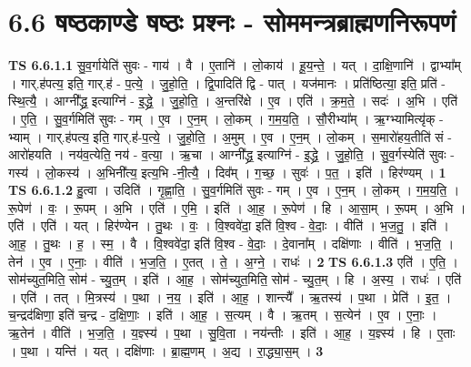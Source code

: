 \documentclass[17pt]{extarticle}
\begin{document}
\section*{ 6.6       षष्ठकाण्डे षष्ठः प्रश्नः - सोममन्त्रब्राह्मणनिरूपणं }
                                \textbf{ TS 6.6.1.1} \newline
                  सु॒व॒र्गायेति॑ सुवः - गाय॑ । वै । ए॒तानि॑ । लो॒काय॑ । हू॒य॒न्ते॒ । यत् । दा॒क्षि॒णानि॑ । द्वाभ्या᳚म् । गार्.ह॑पत्य॒ इति॒ गार्.ह॑ - प॒त्ये॒ । जु॒हो॒ति॒ । द्वि॒पादिति॑ द्वि - पात् । यज॑मानः । प्रति॑ष्ठित्या॒ इति॒ प्रति॑ - स्थि॒त्यै॒ । आग्नी᳚द्ध्र॒ इत्याग्नि॑ - इ॒द्ध्रे॒ । जु॒हो॒ति॒ । अ॒न्तरि॑क्षे । ए॒व । एति॑ । क्र॒म॒ते॒ । सदः॑ । अ॒भि । एति॑ । ए॒ति॒ । सु॒व॒र्गमिति॑ सुवः - गम् । ए॒व । ए॒न॒म् । लो॒कम् । ग॒म॒य॒ति॒ । सौ॒रीभ्या᳚म् । ऋ॒ग्भ्यामित्यृ॑क् - भ्याम् । गार्.ह॑पत्य॒ इति॒ गार्.ह॑-प॒त्ये॒ । जु॒हो॒ति॒ । अ॒मुम् । ए॒व । ए॒न॒म् । लो॒कम् । स॒मारो॑हय॒तीति॑ सं - आरो॑हयति । नय॑व॒त्येति॒ नय॑ - व॒त्या॒ । ऋ॒चा । आग्नी᳚द्ध्र॒ इत्याग्नि॑ - इ॒द्ध्रे॒ । जु॒हो॒ति॒ । सु॒व॒र्गस्येति॑ सुवः - गस्य॑ । लो॒कस्य॑ । अ॒भिनी᳚त्य॒ इत्य॒भि -नी॒त्यै॒ । दिव᳚म् । ग॒च्छ॒ । सुवः॑ । प॒त॒ । इति॑ । हिर॑ण्यम् । \textbf{  1} \newline
                  \newline
                                \textbf{ TS 6.6.1.2} \newline
                  हु॒त्वा । उदिति॑ । गृ॒ह्णा॒ति॒ । सु॒व॒र्गमिति॑ सुवः - गम् । ए॒व । ए॒न॒म् । लो॒कम् । ग॒म॒य॒ति॒ । रू॒पेण॑ । वः॒ । रू॒पम् । अ॒भि । एति॑ । ए॒मि॒ । इति॑ । आ॒ह॒ । रू॒पेण॑ । हि । आ॒सा॒म् । रू॒पम् । अ॒भि । एति॑ । एति॑ । यत् । हिर॑ण्येन । तु॒थः । वः॒ । वि॒श्ववे॑दा॒ इति॑ वि॒श्व - वे॒दाः॒ । वीति॑ । भ॒ज॒तु॒ । इति॑ । आ॒ह॒ । तु॒थः । ह॒ । स्म॒ । वै । वि॒श्ववे॑दा॒ इति॑ वि॒श्व - वे॒दाः॒ । दे॒वाना᳚म् । दक्षि॑णाः । वीति॑ । भ॒ज॒ति॒ । तेन॑ । ए॒व । ए॒नाः॒ । वीति॑ । भ॒ज॒ति॒ । ए॒तत् । ते॒ । अ॒ग्ने॒ । राधः॑ । \textbf{  2} \newline
                  \newline
                                \textbf{ TS 6.6.1.3} \newline
                  एति॑ । ए॒ति॒ । सोम॑च्युत॒मिति॒ सोम॑ - च्यु॒त॒म् । इति॑ । आ॒ह॒ । सोम॑च्युत॒मिति॒ सोम॑ - च्यु॒त॒म् । हि । अ॒स्य॒ । राधः॑ । एति॑ । एति॑ । तत् । मि॒त्रस्य॑ । प॒था । न॒य॒ । इति॑ । आ॒ह॒ । शान्त्यै᳚ । ऋ॒तस्य॑ । प॒था । प्रेति॑ । इ॒त॒ । च॒न्द्रद॑क्षिणा॒ इति॑ च॒न्द्र - द॒क्षि॒णाः॒ । इति॑ । आ॒ह॒ । स॒त्यम् । वै । ऋ॒तम् । स॒त्येन॑ । ए॒व । ए॒नाः॒ । ऋ॒तेन॑ । वीति॑ । भ॒ज॒ति॒ । य॒ज्ञ्स्य॑ । प॒था । सु॒वि॒ता । नय॑न्तीः । इति॑ । आ॒ह॒ । य॒ज्ञ्स्य॑ । हि । ए॒ताः । प॒था । यन्ति॑ । यत् । दक्षि॑णाः । ब्रा॒ह्म॒णम् । अ॒द्य । रा॒द्ध्या॒स॒म् । \textbf{  3 } \newline
\end{document}

